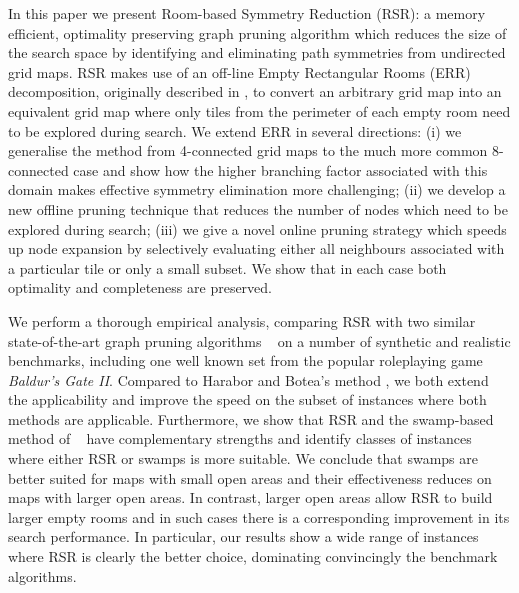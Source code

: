 In this paper we present Room-based Symmetry Reduction (RSR): a
memory efficient, optimality preserving graph pruning algorithm which reduces
the size of the search space by identifying and eliminating path symmetries from
undirected grid maps.
RSR makes use of an off-line Empty Rectangular Rooms (ERR) decomposition, originally described in
\cite{harabor10}, to convert an arbitrary grid map into an equivalent grid map where only tiles from the 
perimeter of each empty room need to be explored during search.
We extend ERR in several directions: (i) we generalise the method from 4-connected grid maps to 
the much more common 8-connected case and show how the higher branching factor associated 
with this domain makes effective symmetry elimination more challenging;
(ii) we develop a new offline pruning technique that reduces the number of nodes which
need to be explored during search;
(iii) we give a novel online pruning strategy which speeds up node expansion by selectively 
evaluating either all neighbours associated with a particular tile or only a small subset.
We show that in each case both optimality and completeness are preserved.
\par
We perform a thorough empirical analysis, comparing RSR with two similar
state-of-the-art graph pruning algorithms ~\cite{pochter10,harabor10}
on a number of synthetic and realistic benchmarks, including one well known set 
from the popular roleplaying game \emph{Baldur's Gate II}.
Compared to Harabor and Botea's method , 
we both extend the applicability and improve the speed
on the subset of instances where both methods are applicable.
Furthermore, we show that RSR and the swamp-based method of 
\citeauthor{pochter10}~
have complementary strengths and identify classes of instances where
either RSR or swamps is more suitable.
We conclude that swamps are better suited for maps with
small open areas and their effectiveness reduces on maps with larger open areas.
In contrast, larger open areas allow RSR to build larger empty rooms and in such
cases there is a corresponding improvement in its search performance.
In particular, our results show a wide range of instances where
RSR is clearly the better choice, dominating convincingly the benchmark algorithms.

